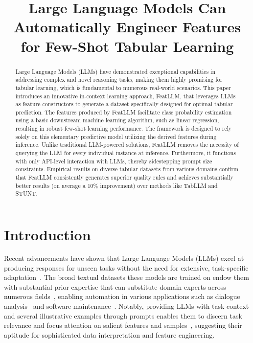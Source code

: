 \title{Large Language Models Can Automatically Engineer Features for Few-Shot Tabular Learning}

\begin{abstract}
Large Language Models (LLMs) have demonstrated exceptional capabilities in addressing complex and novel reasoning tasks, making them highly promising for tabular learning, which is fundamental to numerous real-world scenarios. This paper introduces an innovative in-context learning approach, \textsf{FeatLLM}, that leverages LLMs as feature constructors to generate a dataset specifically designed for optimal tabular prediction. The features produced by \textsf{FeatLLM} facilitate class probability estimation using a basic downstream machine learning algorithm, such as linear regression, resulting in robust few-shot learning performance. The framework is designed to rely solely on this elementary predictive model utilizing the derived features during inference. Unlike traditional LLM-powered solutions, \textsf{FeatLLM} removes the necessity of querying the LLM for every individual instance at inference. Furthermore, it functions with only API-level interaction with LLMs, thereby sidestepping prompt size constraints. Empirical results on diverse tabular datasets from various domains confirm that \textsf{FeatLLM} consistently generates superior quality rules and achieves substantially better results (on average a 10\% improvement) over methods like TabLLM and STUNT.
\end{abstract}

\section{Introduction}
Recent advancements have shown that Large Language Models (LLMs) excel at producing responses for unseen tasks without the need for extensive, task-specific adaptation~\cite{creswell2022selection,imani2023mathprompter,taylor2022galactica}. The broad textual datasets these models are trained on endow them with substantial prior expertise that can substitute domain experts across numerous fields~\cite{Genomes2021,singhal2023large,wilcox2003role}, enabling automation in various applications such as dialogue analysis~\cite{finch2023leveraging} and software maintenance~\cite{fan2023automated}. Notably, providing LLMs with task context and several illustrative examples through prompts enables them to discern task relevance and focus attention on salient features and samples~\cite{brown2020language,zhao2023survey}, suggesting their aptitude for sophisticated data interpretation and feature engineering.

